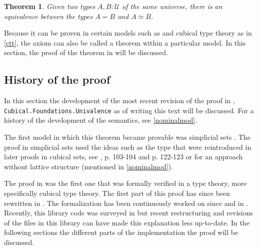 \documentclass[12pt,a4paper,twoside,xetex]{book} %
\newtheorem{theorem}{Theorem}[section]
\begin{document}
\begin{theorem}
 Given two types $A, B : \mathcal{U}$ of the same universe, there is an 
equivalence between the types $A = B$ and $A \simeq B$.
 \end{theorem}

Because it can be proven in certain models such as \cite{Kapulkin2012} and 
cubical type theory as in \cref{ctt}, the axiom can also be called a theorem 
within a particular model. In this section, the proof of the theorem in 
\cite{Moertberg2018} will be discussed.

\subsection{History of the proof}

In this section the development of the most recent revision of the proof in  \cite{Moertberg2018}, \texttt{Cubical.Foundations.Univalence} as of writing this 
text will be discussed. For a history of the development of the semantics, see \cref{nominalmod}.

The first model in which this theorem became provable was simplicial sets 
\cite{Kapulkin2012}. The proof in simplicial sets used the ideas such as the 
 type that were reintroduced in later proofs in cubical sets, see 
\cite{Huber2016}, p. 103-104 and p. 122-123 or \cite{Bezem2018} for an approach 
without lattice structure (mentioned in \cref{nominalmod}). 

The proof in \cite{Huber2016} was the first one that was formally verified in a 
type theory, more specifically cubical type theory. The first part of this proof has since been rewritten 
in \cite{Weinberger2016}. The formalization has been continuously worked on 
since \cite{Moertberg2015} and \cite{Cohen2016} in \cite{Moertberg2018}. Recently, this library code was surveyed in \cite{Moertberg2018a} but recent restructuring and revisions of the files in this library can have made this explanation less up-to-date. In the following sections the different parts of the implementation the proof will be discussed.
\end{document}
